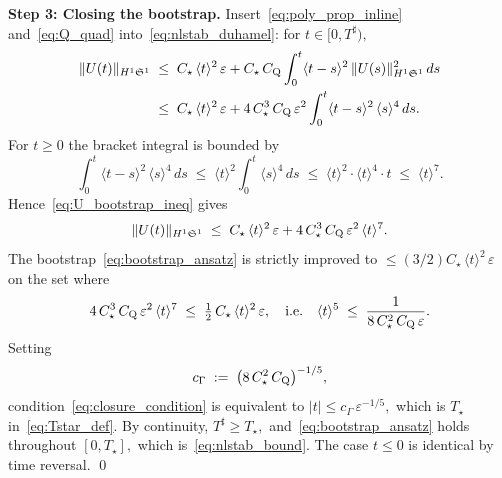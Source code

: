 \documentclass[11pt]{amsart}
\theoremstyle{definition}
\newtheorem{remark}[theorem]{Remark}
\newcommand{\Sp}{\mathfrak{S}}
\begin{document}
\noindent\textbf{Step 3: Closing the bootstrap.} Insert~\eqref{eq:poly_prop_inline} and~\eqref{eq:Q_quad} into~\eqref{eq:nlstab_duhamel}: for $t\in[0,T^\sharp),$
\begin{align}
  \|U(t)\|_{H^1\Sp^1}
  &\;\le\; C_\star\,\langle t\rangle^2\,\varepsilon
  + C_\star\,C_{\rm Q}
  \int_0^t\langle t-s\rangle^2\,
  \|U(s)\|_{H^1\Sp^1}^2\,ds \notag\\
  &\;\le\; C_\star\,\langle t\rangle^2\,\varepsilon
  + 4\,C_\star^{3}\,C_{\rm Q}\,\varepsilon^2
  \int_0^t\langle t-s\rangle^2\,\langle s\rangle^4\,ds.
  \label{eq:U_bootstrap_ineq}
\end{align}
For $t\ge 0$ the bracket integral is bounded by
\begin{equation}\label{eq:bracket_integral}
  \int_0^t\langle t-s\rangle^2\,\langle s\rangle^4\,ds
  \;\le\; \langle t\rangle^2\int_0^t\langle s\rangle^4\,ds
  \;\le\; \langle t\rangle^2\cdot\langle t\rangle^4\cdot t
  \;\le\; \langle t\rangle^7.
\end{equation}
Hence~\eqref{eq:U_bootstrap_ineq} gives
\[
  \|U(t)\|_{H^1\Sp^1}
  \;\le\; C_\star\,\langle t\rangle^2\,\varepsilon
  + 4\,C_\star^{3}\,C_{\rm Q}\,\varepsilon^2\,\langle t\rangle^7.
\]
The bootstrap~\eqref{eq:bootstrap_ansatz} is strictly improved to $\le(3/2)C_\star\,\langle t\rangle^2\,\varepsilon$ on the set where
\begin{equation}\label{eq:closure_condition}
  4\,C_\star^{3}\,C_{\rm Q}\,\varepsilon^2\,\langle t\rangle^7
  \;\le\; \tfrac12\,C_\star\,\langle t\rangle^2\,\varepsilon,
  \quad\text{i.e.}\quad
  \langle t\rangle^{5}
  \;\le\; \frac{1}{8\,C_\star^{2}\,C_{\rm Q}\,\varepsilon}.
\end{equation}
Setting
\begin{equation}\label{eq:cGamma_def}
  c_\Gamma
  \;:=\; \bigl(8\,C_\star^{2}\,C_{\rm Q}\bigr)^{-1/5},
\end{equation}
condition~\eqref{eq:closure_condition} is equivalent to $|t|\le c_\Gamma\,\varepsilon^{-1/5},$ which is $T_\star$ in~\eqref{eq:Tstar_def}. By continuity, $T^\sharp\ge T_\star,$ and~\eqref{eq:bootstrap_ansatz} holds throughout $[0,T_\star],$ which is~\eqref{eq:nlstab_bound}. The case $t\le 0$ is identical by time reversal. \qed

\end{document}
